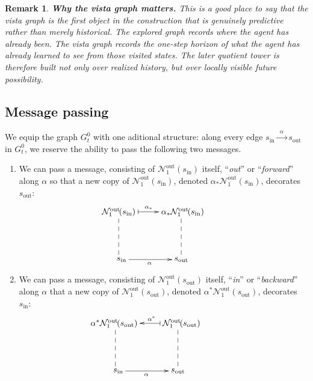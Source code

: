 \documentclass[11pt]{article}
\newtheorem{remark}{Remark}[subsection]
\begin{document}
{\color{blue}
\begin{remark}
{\bf Why the vista graph matters.}
\normalfont
This is a good place to say that the vista graph is the first object in the construction that is genuinely predictive rather than merely historical. The explored graph records where the agent has already been. The vista graph records the one-step horizon of what the agent has already learned to see from those visited states. The later quotient tower is therefore built not only over realized history, but over locally visible future possibility.
\end{remark}
}

\subsection{Message passing}

We equip the graph $G^{0}_{t}$ with one aditional structure: along every edge $s_{\text{in}}\xrightarrow{\ \ \alpha\ \ }s_{\text{out}}$ in $G^{0}_{t}$, we reserve the ability to pass the following two messages.
\begin{enumerate}
\item
We can pass a message, consisting of  $\mathcal{N}^{\text{out}\!}_{1}(s_{\text{in}})$ itself, ``{\em out}'' or ``{\em forward}'' along $\alpha$ so that a new copy of $\mathcal{N}^{\text{out}\!}_{1}(s_{\text{in}})$, denoted $\alpha_\ast\mathcal{N}^{\text{out}\!}_{1}(s_{\text{in}})$, decorates $s_{\text{out}}$:
$$
\!\!\!\!\!\!\!\!\!\!\!\!\!\!\!\!\!\!\!\!\!
\begin{xy}
(0,0)*+{\mathcal{N}^{\text{out}\!}_{1}(s_{\text{in}})}="1";
(25,0)*+{\alpha_\ast\mathcal{N}^{\text{out}\!}_{1}(s_{\text{in}})\!\!\!\!\!\!}="2";
(0,-20)*+{s_\text{in}\!\!\!\!}="3";
(25,-20)*+{\ \ s_\text{out}}="4";
{\ar@{|->}^{\alpha_\ast} "1"; "2"}
{\ar@{--} "1"; "3"}
{\ar@{--} "2"; "4"}
{\ar@{->}_{\!\!\!\!\!\!\!\!\alpha} "3"; "4"}
\end{xy}
$$
\item
We can pass a message, consisting of  $\mathcal{N}^{\text{out}\!}_{1}(s_{\text{out}})$ itself, ``{\em in}'' or ``{\em backward}'' along $\alpha$ that a new copy of $\mathcal{N}^{\text{out}\!}_{1}(s_{\text{out}})$, denoted $\alpha^{\ast}\mathcal{N}^{\text{out}\!}_{1}(s_{\text{out}})$, decorates $s_{\text{in}}$:
$$
\!\!\!\!\!\!\!\!\!\!\!\!\!\!\!\!\!\!\!\!\!
\!\!\!\!\!\!\!\!\!\!\!\!
\begin{xy}
(0,0)*+{\!\!\alpha^{\ast}\mathcal{N}^{\text{out}\!}_{1}(s_{\text{out}})}="1";
(25,0)*+{\mathcal{N}^{\text{out}\!}_{1}(s_{\text{out}})\!\!\!\!\!\!\!\!\!}="2";
(0,-20)*+{s_\text{in}\!\!\!\!}="3";
(25,-20)*+{\ \ s_\text{out}}="4";
{\ar@{|->}_{\ \ \alpha^\ast\!\!\!\!\!\!} "2"; "1"}
{\ar@{--} "1"; "3"}
{\ar@{--} "2"; "4"}
{\ar@{->}_{\!\!\!\!\!\!\!\!\alpha} "3"; "4"}
\end{xy}
$$
\end{enumerate}
\end{document}
